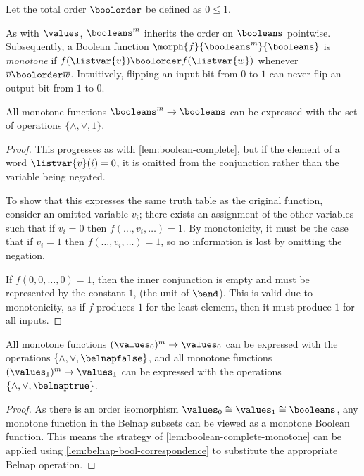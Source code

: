 \begin{definition}
    Let the total order \(\boolorder\) be defined as \(0 \leq 1\).
\end{definition}

As with \(\values\), \(\booleans^m\) inherits the order on \(\booleans\)
pointwise.
Subsequently, a Boolean function \(\morph{f}{\booleans^m}{\booleans}\) is
\emph{monotone} if \(f(\listvar{v}) \boolorder f(\listvar{w})\) whenever
\(\overline{v} \boolorder \overline{w}\).
Intuitively, flipping an input bit from \(0\) to \(1\) can never flip an output
bit from \(1\) to \(0\).

\begin{lemma}
    \label{lem:boolean-complete-monotone}
    All monotone functions \(\booleans^m \to \booleans\) can be expressed with
    the set of operations \(\{\land,\lor,1\}\).
\end{lemma}
\begin{proof}
    This progresses as with \cref{lem:boolean-complete}, but if the element of
    a word \(\listvar{v}(i) = 0\), it is omitted from the conjunction
    rather than the variable being negated.

    To show that this expresses the same truth table as the original function,
    consider an omitted variable \(v_i\); there exists an assignment of the
    other variables such that if \(v_i = 0\) then \(f(\dots, v_i, \dots) = 1\).
    By monotonicity, it must be the case that if \(v_i = 1\) then
    \(f(\dots, v_i, \dots) = 1\), so no information is lost by omitting
    the negation.

    If \(f(0, 0, \dots, 0) = 1\), then the inner conjunction is empty and must
    be represented by the constant \(1\), (the unit of \(\band\)).
    This is valid due to monotonicity, as if \(f\) produces \(1\) for the
    least element, then it must produce \(1\) for all inputs.
\end{proof}

\begin{corollary}\label{cor:func-complete-falsy-truthy}
    All monotone functions \((\values_0)^m \to \values_0\) can be expressed
    with the operations \(\{\land,\lor,\belnapfalse\}\), and all monotone
    functions \((\values_1)^m \to \values_1\) can be expressed with the
    operations \(\{\land,\lor,\belnaptrue\}\).
\end{corollary}
\begin{proof}
    As there is an order isomorphism
    \(\values_0 \cong \values_1 \cong \booleans\), any monotone function in
    the Belnap subsets can be viewed as a monotone Boolean function.
    This means the strategy of \cref{lem:boolean-complete-monotone} can
    be applied using \cref{lem:belnap-bool-correspondence} to substitute the
    appropriate Belnap operation.
\end{proof}

